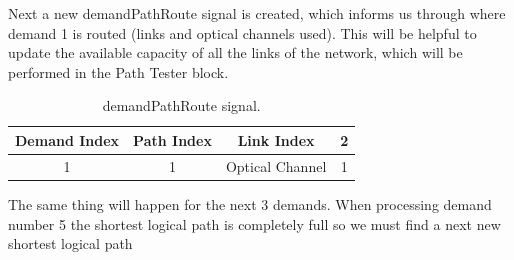 Next a new demandPathRoute signal is created, which informs us through where demand 1 is routed (links and optical channels used). This will be helpful to update the available capacity of all the links of the network, which will be performed in the Path Tester block.
\begin{table}[H]
	\centering
	\begin{tabular}{|c|c|c|c|}
		\hline
		Demand Index           & Path Index             & Link Index                       & 2                   \\ \hline
		\multirow{2}{*}{1} & \multirow{2}{*}{1} & \multirow{2}{*}{Optical Channel} & \multirow{2}{*}{1} \\
		&                        &                                  &                          \\ \hline
	\end{tabular}
	\caption{demandPathRoute signal.}
	\label{demandPathRoute_signal}
\end{table} 

The same thing will happen for the next 3 demands. When processing demand number 5 the shortest logical path is completely full so we must find a next new shortest logical path

